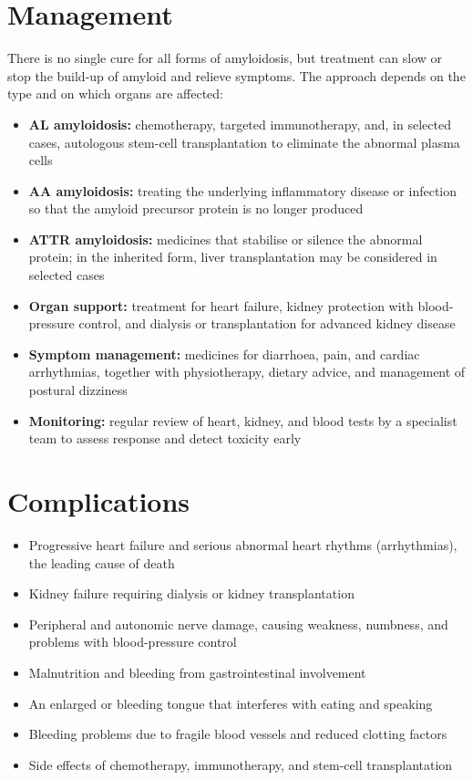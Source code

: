 \section*{Management}
There is no single cure for all forms of amyloidosis, but treatment can slow or stop the build-up of amyloid and relieve symptoms. The approach depends on the type and on which organs are affected:
\begin{itemize}
    \item \textbf{AL amyloidosis:} chemotherapy, targeted immunotherapy, and, in selected cases, autologous stem-cell transplantation to eliminate the abnormal plasma cells
    \item \textbf{AA amyloidosis:} treating the underlying inflammatory disease or infection so that the amyloid precursor protein is no longer produced
    \item \textbf{ATTR amyloidosis:} medicines that stabilise or silence the abnormal protein; in the inherited form, liver transplantation may be considered in selected cases
    \item \textbf{Organ support:} treatment for heart failure, kidney protection with blood-pressure control, and dialysis or transplantation for advanced kidney disease
    \item \textbf{Symptom management:} medicines for diarrhoea, pain, and cardiac arrhythmias, together with physiotherapy, dietary advice, and management of postural dizziness
    \item \textbf{Monitoring:} regular review of heart, kidney, and blood tests by a specialist team to assess response and detect toxicity early
\end{itemize}

\section*{Complications}
\begin{itemize}
    \item Progressive heart failure and serious abnormal heart rhythms (arrhythmias), the leading cause of death
    \item Kidney failure requiring dialysis or kidney transplantation
    \item Peripheral and autonomic nerve damage, causing weakness, numbness, and problems with blood-pressure control
    \item Malnutrition and bleeding from gastrointestinal involvement
    \item An enlarged or bleeding tongue that interferes with eating and speaking
    \item Bleeding problems due to fragile blood vessels and reduced clotting factors
    \item Side effects of chemotherapy, immunotherapy, and stem-cell transplantation
\end{itemize}

